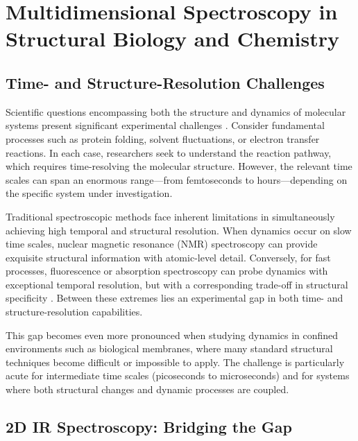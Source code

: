 
\section{Multidimensional Spectroscopy in Structural Biology and Chemistry}
\label{sec:multidimensional_applications}

\subsection{Time- and Structure-Resolution Challenges}
\label{subsec:time_structure_challenges}

\noindent Scientific questions encompassing both the structure and dynamics of molecular systems present significant experimental challenges \cite{hammzanni2011conceptsmethods2d}. Consider fundamental processes such as protein folding, solvent fluctuations, or electron transfer reactions. In each case, researchers seek to understand the reaction pathway, which requires time-resolving the molecular structure. However, the relevant time scales can span an enormous range—from femtoseconds to hours—depending on the specific system under investigation.

\noindent Traditional spectroscopic methods face inherent limitations in simultaneously achieving high temporal and structural resolution. When dynamics occur on slow time scales, nuclear magnetic resonance (NMR) spectroscopy can provide exquisite structural information with atomic-level detail. Conversely, for fast processes, fluorescence or absorption spectroscopy can probe dynamics with exceptional temporal resolution, but with a corresponding trade-off in structural specificity \cite{hammzanni2011conceptsmethods2d}. Between these extremes lies an experimental gap in both time- and structure-resolution capabilities.

\noindent This gap becomes even more pronounced when studying dynamics in confined environments such as biological membranes, where many standard structural techniques become difficult or impossible to apply. The challenge is particularly acute for intermediate time scales (picoseconds to microseconds) and for systems where both structural changes and dynamic processes are coupled.

\subsection{2D IR Spectroscopy: Bridging the Gap}
\label{subsec:2dir_bridging_gap}

